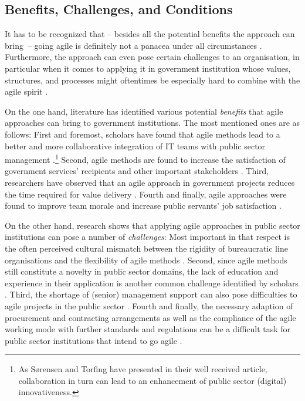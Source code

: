 \subsection{Benefits, Challenges, and Conditions}\label{Benefits, Challenges, and Conditions}
It has to be recognized that – besides all the potential benefits the approach can bring~– going agile is definitely not a panacea under all circumstances \parencite{Rigby2016}. Furthermore, the approach can even pose certain challenges to an organisation, in particular when it comes to applying it in government institution whose values, structures, and processes might oftentimes be especially hard to combine with the agile spirit \parencite{Hajjdiab2011}.

On the one hand, literature has identified various potential \textit{benefits} that agile approaches can bring to government institutions. The most mentioned ones are as follows: First and foremost, scholars have found that agile methods lead to a better and more collaborative integration of IT teams with public sector management \parencite{Upender2005,berger2005uk, Berger2007,Dubinsky2005}.\footnote{As Sørensen and Torfing \parencite*{Sorensen2011} have presented in their well received article, collaboration in turn can lead to an enhancement of public sector (digital) innovativeness.} Second, agile methods are found to increase the satisfaction of government services' recipients and other important stakeholders \parencite{Fruhling2008,  Fulgham2011, iliev2009case}. Third, researchers have observed that an agile approach in government projects reduces the time required for value delivery \parencite{Upender2005, Surdu2006, McMahon2006, Moore2001}. Fourth and finally, agile approaches were found to improve team morale and increase public servants' job satisfaction \parencite{Hajjdiab2011, Vacari2015, Dubinsky2005}. 

On the other hand, research shows that applying agile approaches in public sector institutions can pose a number of \textit{challenges}: Most important in that respect is the often perceived cultural mismatch between the rigidity of bureaucratic line organisations and the flexibility of agile methods \parencite{Mergel, Fruhling2008, Altukhova2016, berger2005uk, Greve2019}. Second, since agile methods still constitute a novelty in public sector domains, the lack of education and experience in their application is another common challenge identified by scholars \parencite{Nuottila2016, McMahon2006, Fridman2016}. Third, the shortage of (senior) management support can also pose difficulties to agile projects in the public sector \parencite{Mergel,Berger2007,Dubinsky2005, Hajjdiab2011}. Fourth and finally, the necessary adaption of procurement and contracting arrangements as well as the compliance of the agile working mode with further standards and regulations can be a difficult task for public sector institutions that intend to go agile \parencite{Nuottila2016,Mergel, Fruhling2008, Fulgham2011}.

